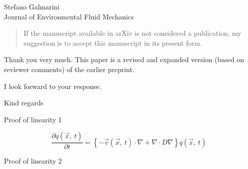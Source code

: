 \documentclass{letter}
\newcommand{\vect}[1]{\vec{#1}}
\begin{document}
\begin{letter}{Stefano Galmarini\\
Journal of Environmental Fluid Mechanics}
\begin{quote}
If the manuscript available in arXiv is not considered a publication, my suggestion is to accept this manuscript in its present form.
\end{quote}

Thank you very much. This paper is a revised and expanded version (based on reviewer comments) of the earlier preprint.

I look forward to your response.

\closing{Kind regards}

{\Large Proof of linearity 1}

\begin{equation}
\frac{\partial q(\vect x, ~ t)}{\partial t} = \left \lbrace -\vect v(\vect x, ~t) \cdot \nabla + \nabla \cdot D \nabla \right \rbrace q(\vect x, ~ t)
\label{advection_diffusion}
\end{equation}



{\Large Proof of linearity 2}



\end{letter}
\end{document}
